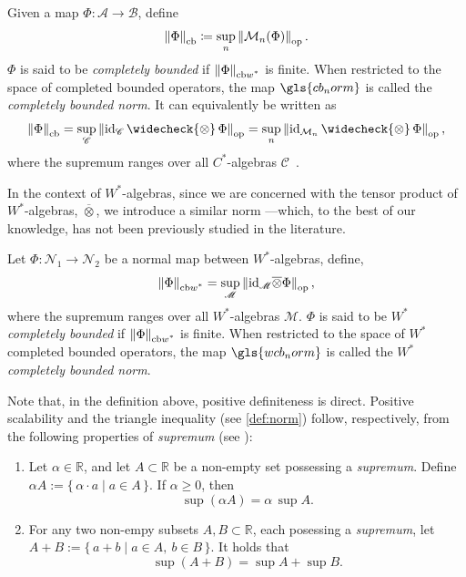 \begin{definition} \label{def:cb_norm}
Given a map \( \Phi \colon \mathscr{A} \to \mathscr{B} \), define
\[
\left\lVert \Phi \right\rVert_{\text{cb}} \coloneqq \sup_{n} \left\lVert \mathcal{M}_{n}(\Phi) \right\rVert_{\text{op}}.
\]
$\Phi$ is said to be \emph{completely bounded} if $\left\lVert \Phi \right\rVert_{\text{cb$w^*$}}$ is finite.
When restricted to the space of completed bounded operators, the map \( \gls{cb_norm} \) is called the \emph{completely bounded norm}.  
It can equivalently be written as
\[
\cbnorm{\Phi} = \sup_{\mathscr{C}} \opnorm{\id_{\mathscr{C}} \,\widecheck{\otimes}\, \Phi} 
= \sup_{n} \opnorm{\id_{\SqMatrix{n}} \,\widecheck{\otimes}\, \Phi},
\]
where the supremum ranges over all \( C^* \)-algebras \( \mathscr{C} \)~\cite[Introduction, p.~4]{pisierTensorProductsCAlgebras2020}. 
\end{definition} 

In the context of $W^*$-algebras, since we are concerned with the tensor product of $W^*$-algebras, $\overline{\otimes}$, we introduce a similar norm
---which, to the best of our knowledge, has not been previously studied in the literature.
\begin{definition} \label{def:wcb_nor}
  Let $\Phi:\mathscr{N}_1 \to \mathscr{N}_2$ be a normal map between $W^*$-algebras, define,
  \[ \left\lVert \Phi \right\rVert_{\text{cb$w^*$}} = \sup_{\mathscr{M}} \left\lVert \mathrm{id}_{\mathscr{M}} \overline{\otimes} \Phi \right\rVert_{\text{op}}, \]
where the supremum ranges over all $W^*$-algebras \( \mathscr{M} \). $\Phi$ is said to be \emph{$W^*$ completely bounded} if $\left\lVert \Phi \right\rVert_{\text{cb$w^*$}}$ is finite.
When restricted to the space of $W^*$ completed bounded operators, the map \( \gls{wcb_norm}\) is called the \emph{$W^*$ completely bounded norm}.
\end{definition}


Note that, in the definition above, positive definiteness is direct. 
Positive scalability and the triangle inequality (see \autoref{def:norm}) 
follow, respectively, from the following properties of \emph{supremum} (see \cite[Chapter 2, Section 8-9]{zakon2011mathematical}):
\begin{enumerate}
  \item Let \( \alpha \in \mathbb{R} \), and let \( A \subset \mathbb{R} \) be a non-empty set possessing a \emph{supremum}. Define \(\alpha A := \{\, \alpha \cdot a \mid a \in A \,\}
\).
If $\alpha \geq 0$, then
\[
\sup(\alpha A) = \alpha \, \sup A.
\]
 \item For any two non-empy subsets $A, B \subset \mathbb{R}$, each posessing a \emph{supremum},  
let 
\(
A + B := \{\, a + b \mid a \in A, \ b \in B \,\}.
\)
It holds that
\[
\sup(A + B) = \sup A + \sup B .
\]
\end{enumerate}


